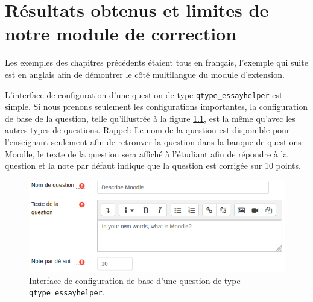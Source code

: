 \chapter{R\'esultats obtenus et limites de notre module de correction}
Les exemples des chapitres pr\'ec\'edents \'etaient tous en fran\c{c}ais, l'exemple qui suite est en anglais afin de d\'emontrer le c\^ot\'e multilangue du module d'extension.

L'interface de configuration d'une question de type \texttt{qtype\_essayhelper} est simple.
Si nous prenons seulement les configurations importantes, la configuration de base de la question, telle qu'illustr\'ee \`a la figure \ref{questionform_base}, est la m\^eme qu'avec les autres types de questions.
Rappel: Le nom de la question est disponible pour l'enseignant seulement afin de retrouver la question dans la banque de questions Moodle, le texte de la question sera affich\'e \`a l'\'etudiant afin de r\'epondre \`a la question et la note par d\'efaut indique que la question est corrig\'ee sur 10 points.
\begin{figure}[htbp]
  \includegraphics[scale=0.85]{images/questionform_base.png}
  \caption{Interface de configuration de base d'une question de type \texttt{qtype\_essayhelper}.}
  \label{questionform_base}
\end{figure}

